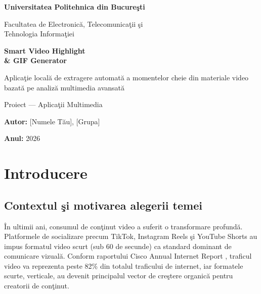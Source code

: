 \documentclass[12pt,a4paper]{article}
\begin{document}
\begin{titlepage}
    \begin{center}
        \vspace*{1.5cm}

        \Large
        \textbf{Universitatea Politehnica din Bucure\c{s}ti}

        \vspace{0.5cm}
        \large
        Facultatea de Electronic\u{a}, Telecomunica\c{t}ii \c{s}i\\Tehnologia Informa\c{t}iei

        \vspace{2cm}

        \Huge
        \textbf{Smart Video Highlight \\& GIF Generator}

        \vspace{1cm}

        \Large
        Aplica\c{t}ie local\u{a}{} de extragere automat\u{a}{} a momentelor cheie din materiale video bazat\u{a}{} pe analiz\u{a}{} multimedia avansat\u{a}{}

        \vspace{0.5cm}
        \large
        Proiect --- Aplica\c{t}ii Multimedia

        \vspace{3cm}

        \Large
        \textbf{Autor:} [Numele T\u{a}u], [Grupa]

        \vspace{0.8cm}

        \textbf{Anul:} 2026

        \vfill

    \end{center}
\end{titlepage}

\newpage
\tableofcontents
\newpage

\section{Introducere}

\subsection{Contextul \c{s}i motivarea alegerii temei}

\^{I}n ultimii ani, consumul de con\c{t}inut video a suferit o transformare profund\u{a}. Platformele de socializare precum TikTok, Instagram Reels \c{s}i YouTube Shorts au impus formatul video scurt (sub 60 de secunde) ca standard dominant de comunicare vizual\u{a}. Conform raportului Cisco Annual Internet Report \cite{cisco2020}, traficul video va reprezenta peste 82\% din totalul traficului de internet, iar formatele scurte, verticale, au devenit principalul vector de cre\c{s}tere organic\u{a}{} pentru creatorii de con\c{t}inut.
\end{document}
